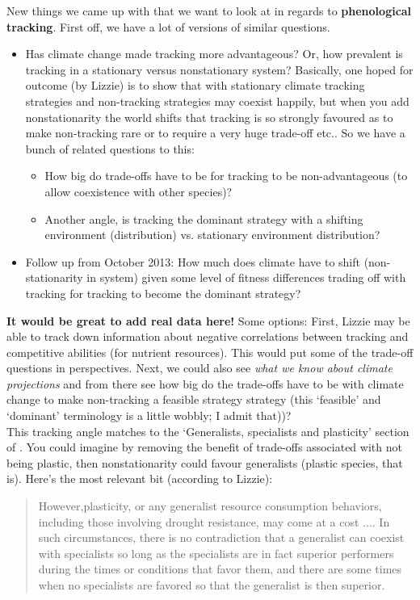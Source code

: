 \documentclass[11pt,a4paper,oneside]{article}
\begin{document}
\noindent New things we came up with that we want to look at in regards to {\bf phenological tracking}. First off, we have a lot of versions of similar questions. 
\begin{itemize}
\item Has climate change made tracking more advantageous? Or, how prevalent is tracking in a stationary versus nonstationary system? Basically, one hoped for outcome (by Lizzie) is to show that with stationary climate tracking strategies and non-tracking strategies may coexist happily, but when you add nonstationarity the world shifts that tracking is so strongly favoured as to make non-tracking rare or to require a very huge trade-off etc.. So we have a bunch of related questions to this:
\begin{itemize}
\item How big do trade-offs have to be for tracking to be non-advantageous (to allow coexistence with other species)?
\item Another angle, is tracking the dominant strategy with a shifting environment (distribution) vs. stationary environment distribution?
\end{itemize}
\item Follow up from October 2013: How much does climate have to shift (non-stationarity in system) given some level of fitness differences trading off with tracking for tracking to become the dominant strategy?
\end{itemize}
{\bf It would be great to add real data here!} Some options: First, Lizzie may be able to track down information about negative correlations between tracking and competitive abilities (for nutrient resources). This would put some of the trade-off questions in perspectives. Next, we could also see  \emph{what we know about climate projections} and from there see how big do the trade-offs have to be with climate change to make non-tracking a feasible strategy strategy (this `feasible' and `dominant' terminology is a little wobbly; I admit that))?\\

\noindent This tracking angle matches to the `Generalists, specialists and plasticity' section of \citet{Chesson:2004eo}. You could imagine by removing the benefit of trade-offs associated with not being plastic, then nonstationarity could favour generalists (plastic species, that is). Here's the most relevant bit (according to Lizzie):
\begin{quote}
However,plasticity, or any generalist resource consumption
behaviors, including those involving drought resistance,
may come at a cost .... In such circumstances, there is no
contradiction that a generalist can coexist with specialists
so long as the specialists are in fact superior performers
during the times or conditions that favor them, and there 
are some times when no specialists are favored so that the
generalist is then superior.
\end{quote}
\end{document}
